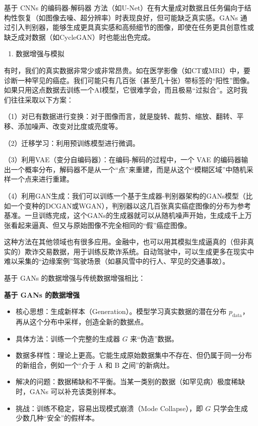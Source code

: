 基于 CNNs 的编码器-解码器 方法（如U-Net）在有大量成对数据且任务偏向于结构性恢复（如图像去噪、超分辨率）时表现良好，但可能缺乏真实感。GANs 通过引入判别器，能够生成更具真实感和高频细节的图像，即使在任务更具创意性或缺乏成对数据（如CycleGAN）时也能出色完成。

\begin{enumerate}
\def\labelenumi{\arabic{enumi}.}
\setcounter{enumi}{2}
\tightlist
\item
  数据增强与模拟
\end{enumerate}

有时，我们的真实数据非常少或非常昂贵。如在医学影像（如CT或MRI）中，要诊断一种罕见的癌症。我们可能只有几百张（甚至几十张）带标签的``阳性''图像。如果只用这点数据去训练一个AI模型，它很难学会，而且极易``过拟合''。这时我们往往采取以下方案：

（1）对已有数据进行变换：对于图像而言，就是旋转、裁剪、缩放、翻转、平移、添加噪声、改变对比度或亮度等。

（2）迁移学习：利用预训练模型进行微调。

（3）利用VAE（变分自编码器）：在编码-解码的过程中，一个 VAE 的编码器输出一个概率分布，解码器不是从一个``点''来重建，而是从这个``模糊区域''中随机采样一个点来进行重建。

（4）利用GAN生成：我们可以训练一个基于生成器-判别器架构的GANs模型（比如一个变种的DCGAN或WGAN），判别器以这几百张真实癌症图像的分布为参考基准。一旦训练完成，这个GANs的生成器就可以从随机噪声开始，生成成千上万张看起来逼真、但又与原始图像不完全相同的``假''癌症图像。

这种方法在其他领域也有很多应用。金融中，也可以用其模拟生成逼真的（但非真实的）欺诈交易数据，用于训练反欺诈系统。自动驾驶中，可以生成更多在现实中难以采集的``边缘案例''驾驶场景（如暴风雪中的行人、罕见的交通事故）。

基于 GANs 的数据增强与传统数据增强相比：

\textbf{基于 GANs 的数据增强}

\begin{itemize}
\tightlist
\item
  核心思想：生成新样本（Generation）。模型学习真实数据的潜在分布 \(p_{\mathrm{data}}\)，再从这个分布中采样，创造全新的数据点。
\item
  具体方法：训练一个完整的生成器 \(G\) 来``伪造''数据。
\item
  数据多样性：理论上更高。它能生成原始数据集中不存在、但仍属于同一分布的新组合，例如一个``介于 A 和 B 之间''的新病灶。
\item
  解决的问题：数据稀缺和不平衡。当某一类别的数据（如罕见病）极度稀缺时，GANs 可以补充该类别样本。
\item
  挑战：训练不稳定，容易出现模式崩溃（Mode Collapse），即 \(G\) 只学会生成少数几种``安全''的假样本。
\end{itemize}

